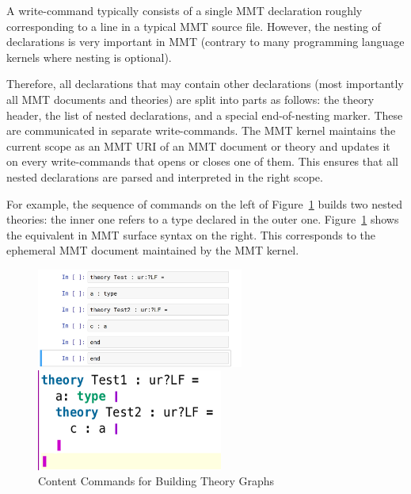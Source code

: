 A write-command typically consists of a single MMT declaration roughly corresponding to a line in a typical MMT source file.
However, the nesting of declarations is very important in MMT (contrary to many programming language kernels where nesting is optional).


Therefore, all declarations that may contain other declarations (most importantly all MMT documents and theories) are split into parts as follows: the theory header, the list of nested declarations, and a special end-of-nesting marker. These are communicated in separate write-commands.
The MMT kernel maintains the current scope as an MMT URI of an MMT document or theory and updates it on every write-commands that opens or closes one of them.
This ensures that all nested declarations are parsed and interpreted in the right scope.

For example, the sequence of commands on the left of Figure~\ref{fig:test_theory} builds two nested theories: the inner one refers to a type declared in the outer one. Figure~\ref{fig:test_theory} shows the equivalent in MMT surface syntax on the right. This corresponds to the ephemeral MMT document maintained by the MMT kernel.
\begin{figure}[ht]\centering
\begin{minipage}[c]{6.8cm}\includegraphics[width=6.8cm]{test_theory_jupyter}\end{minipage}
\begin{minipage}[c]{6.1cm}\includegraphics[width=6.1cm]{test_theory}\end{minipage}
\caption{Content Commands for Building Theory Graphs}\label{fig:test_theory}
\end{figure}

